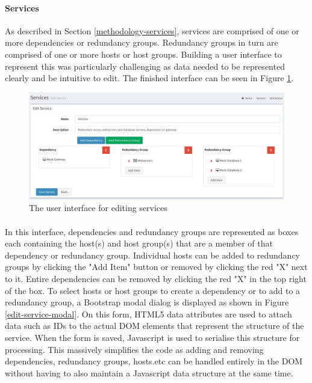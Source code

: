 \documentclass[bsc,logo,twoside,singlespacing,notimes]{infthesis}
\begin{document}
\paragraph*{Services}
	As described in Section \ref{methodology-services}, services are comprised of
	one or more dependencies or redundancy groups.  Redundancy groups in turn are
	comprised of one or more hosts or host groups.  Building a user interface to
	represent this was particularly challenging as data needed to be represented
	clearly and be intuitive to edit.  The finished interface can be seen in
	Figure \ref{edit-service}.
	
\begin{figure}[H]
	\centering
	\caption{The user interface for editing services}
	\label{edit-service}
	\includegraphics[scale=0.44]{assets/screenshots/edit-service.pdf}
\end{figure}

\paragraph*{}
	In this interface, dependencies and redundancy groups are represented as boxes
	each containing the host(s) and host group(s) that are a member of that
	dependency or redundancy group.  Individual hosts can be added to redundancy
	groups by clicking the "Add Item" button or removed by clicking the red "X"
	next to it.  Entire dependencies can be removed by clicking the red "X" in the
	top right of the box.  To select hosts or host groups to create a dependency
	or to add to a redundancy group, a Bootstrap modal dialog is displayed as
	shown in Figure \ref{edit-service-modal}.  On this form, HTML5 data attributes
	are used to attach data such as IDs to the actual DOM elements that represent
	the structure of the service.  When the form is saved, Javascript is used to
	serialise this structure for processing.  This massively simplifies the code
	as adding and removing dependencies, redundancy groups, hosts.etc can be
	handled entirely in the DOM without having to also maintain a Javascript data
	structure at the same time.
	
\end{document}

